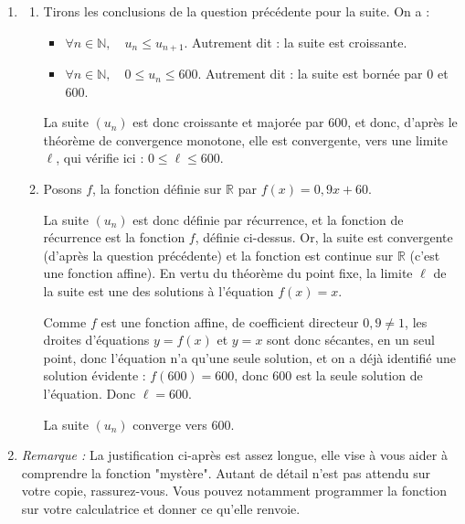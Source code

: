 \documentclass[10pt]{article}
\providecommand{\R}{\mathbb{R}}
\providecommand{\N}{\mathbb{N}}
\begin{document}
\begin{enumerate}
La véracité de l'inégalité est donc héréditaire.

\textbf{Conclusion :} L'inégalité est vraie à l'indice 0, et pour tout indice $n$ entier naturel, la véracité est héréditaire. En vertu du principe de récurrence, on peut donc conclure que, pour tout entier naturel $n$, on a : \quad $0  \leqslant u_n  \leqslant u_{n+1} \leqslant  600$.
	\item
		\begin{enumerate}
			\item Tirons les conclusions de la question précédente pour la suite. On a :

			\begin{itemize}
				\item $\forall n \in \N, \quad u_n \leqslant u_{n+1}$. \quad Autrement dit : la suite est croissante.
				\item $\forall n \in \N, \quad 0\leqslant u_n \leqslant 600$. \quad Autrement dit : la suite est bornée par 0 et 600.
			\end{itemize}

			La suite $(u_n)$ est donc croissante et majorée par 600, et donc, d'après le théorème de convergence monotone, elle est convergente, vers une limite $\ell$, qui vérifie ici : $0 \leqslant \ell \leqslant 600$.
			\item Posons $f$, la fonction définie sur $\R$ par $f(x) = 0,9x + 60$.

			La suite $(u_n)$ est donc définie par récurrence, et la fonction de récurrence est la fonction $f$, définie ci-dessus. Or, la suite est convergente (d'après la question précédente) et la fonction est continue sur $\R$ (c'est une fonction affine). En vertu du théorème du point fixe, la limite $\ell$ de la suite est une des solutions à l'équation $f(x) = x$.

			Comme $f$ est une fonction affine, de coefficient directeur $0,9 \neq 1$, les droites d'équations $y = f(x)$ et $y=x$ sont donc sécantes, en un seul point, donc l'équation n'a qu'une seule solution, et on a déjà identifié une solution évidente : $f(600) = 600$, donc 600 est la seule solution de l'équation. Donc $\ell = 600$.

			La suite $(u_n)$ converge vers 600.
		\end{enumerate}
	\item \emph{Remarque : }La justification ci-après est assez longue, elle vise à vous aider à comprendre la fonction "mystère". Autant de détail n'est pas attendu sur votre copie, rassurez-vous. Vous pouvez notamment programmer la fonction sur votre calculatrice et donner ce qu'elle renvoie.


\end{enumerate}
\end{document}
